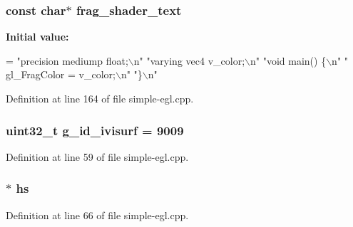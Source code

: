 \subsubsection[{\texorpdfstring{frag\+\_\+shader\+\_\+text}{frag_shader_text}}]{\setlength{\rightskip}{0pt plus 5cm}const char$\ast$ frag\+\_\+shader\+\_\+text\hspace{0.3cm}{\ttfamily [static]}}\hypertarget{simple-egl_8cpp_ab5a6a2a26ac23f79b1687daa4b0d8980}{}\label{simple-egl_8cpp_ab5a6a2a26ac23f79b1687daa4b0d8980}
{\bfseries Initial value\+:}
\begin{DoxyCode}
=
    \textcolor{stringliteral}{"precision mediump float;\(\backslash\)n"}
    \textcolor{stringliteral}{"varying vec4 v\_color;\(\backslash\)n"}
    \textcolor{stringliteral}{"void main() \{\(\backslash\)n"}
    \textcolor{stringliteral}{"  gl\_FragColor = v\_color;\(\backslash\)n"}
    \textcolor{stringliteral}{"\}\(\backslash\)n"}
\end{DoxyCode}


Definition at line 164 of file simple-\/egl.\+cpp.

\subsubsection[{\texorpdfstring{g\+\_\+id\+\_\+ivisurf}{g_id_ivisurf}}]{\setlength{\rightskip}{0pt plus 5cm}uint32\+\_\+t g\+\_\+id\+\_\+ivisurf = 9009}\hypertarget{simple-egl_8cpp_a28f56c9f01ed9f108201950645317cc9}{}\label{simple-egl_8cpp_a28f56c9f01ed9f108201950645317cc9}


Definition at line 59 of file simple-\/egl.\+cpp.

\subsubsection[{\texorpdfstring{hs}{hs}}]{$\ast$ hs}\hypertarget{simple-egl_8cpp_a529acbd1fed9d98a587edfa62309fa8d}{}\label{simple-egl_8cpp_a529acbd1fed9d98a587edfa62309fa8d}


Definition at line 66 of file simple-\/egl.\+cpp.

